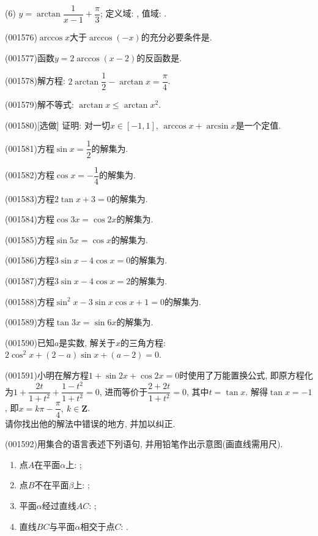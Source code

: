 (6) $y=\arctan \dfrac{1}{x-1}+\dfrac{\pi}{3}$; 定义域: , 值域: .
\item (001576)$\arccos x$大于$\arccos (-x)$的充分必要条件是.
\fourch{$x \in [0,1]$}{$x\in [-1,0)$}{$x=0$}{$x\in [-1,1]$}
\item (001577)函数$y=2\arccos(x-2)$的反函数是.
\item (001578)解方程: $2\arctan \dfrac{1}{2}-\arctan x=\dfrac{\pi}{4}$.
\item (001579)解不等式: $\arctan x\le \arctan x^2$.
\item (001580)[选做]
证明: 对一切$x\in [-1,1]$, $\arccos x+\arcsin x$是一个定值.
\item (001581)方程$\sin x=\dfrac{1}{2}$的解集为.
\item (001582)方程$\cos x=-\dfrac{1}{4}$的解集为.
\item (001583)方程$2\tan x+3=0$的解集为.
\item (001584)方程$\cos 3x=\cos 2x$的解集为.
\item (001585)方程$\sin 5x=\cos x$的解集为.
\item (001586)方程$3\sin x-4\cos x=0$的解集为.
\item (001587)方程$3\sin x-4\cos x=2$的解集为.
\item (001588)方程$\sin^2x-3\sin x\cos x+1=0$的解集为.
\item (001589)方程$\tan 3x=\sin 6x$的解集为.
\item (001590)已知$a$是实数, 解关于$x$的三角方程: $2\cos^2 x+(2-a)\sin x+(a-2)=0$.
\item (001591)小明在解方程$1+\sin 2x+\cos 2x=0$时使用了万能置换公式, 即原方程化为$1+\dfrac{2t}{1+t^2}+\dfrac{1-t^2}{1+t^2}=0$, 进而等价于$\dfrac{2+2t}{1+t^2}=0$, 其中$t=\tan x$. 解得$\tan x=-1$, 即$x=k\pi-\dfrac{\pi}{4}, \ k\in \mathbf{Z}$.\\ 
请你找出他的解法中错误的地方, 并加以纠正.
\item (001592)用集合的语言表述下列语句, 并用铅笔作出示意图(画直线需用尺).
\begin{enumerate}[(1)]
\item 点$A$在平面$\alpha$上: ;\\ 
\item 点$B$不在平面$\beta$上: ;\\ 
\item 平面$\alpha$经过直线$AC$: ;\\ 
\item 直线$BC$与平面$\alpha$相交于点$C$: .\\ 
\end{enumerate}
